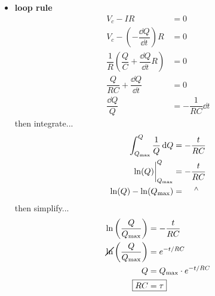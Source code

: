 \documentclass{article}
\begin{document}
    \begin{itemize}
      \item \textbf{loop rule}
        \begin{align*}
          V_c-IR&=0\\
          V_c-\left(-\dfrac{\dd{Q}}{\dd{t}}\right)R&=0\\
          \dfrac{1}{R}\left(\dfrac{Q}{C}+\dfrac{\dd{Q}}{\dd{t}}R\right)&=0\\
          \dfrac{Q}{RC}+\dfrac{\dd{Q}}{\dd{t}}&=0\\
          \dfrac{\dd{Q}}{Q}&=-\dfrac{1}{RC}\dd{t}
        \end{align*}
        then integrate...
        \begin{align*}
          \int_{Q_{\mathrm{max}}}^{Q} \dfrac{1}{Q} \dd{Q} &= -\dfrac{t}{RC}\\
          \ln(Q )\bigg|_{Q_{\mathrm{max}}}^Q&=-\dfrac{t}{RC}\\
          \ln(Q) -\ln(Q_{\mathrm{max}})&=\hskip 4mm {}^\wedge
        \end{align*}
        then simplify...
        \begin{align*}
          \ln\left(\dfrac{Q}{Q_{\mathrm{max}}}\right)&=-\dfrac{t}{RC}\\
          \cancel{\ln}\left(\dfrac{Q}{Q_{\mathrm{max}}}\right)&=e^{-{t}/{RC}}\\
          Q&=Q_{\mathrm{max}}\cdot e^{-{t}/{RC}}\\
          \Aboxed{RC&=\tau}
        \end{align*}
        \begin{figure}[H]
          \centering

\end{figure}
\end{itemize}
\end{document}
